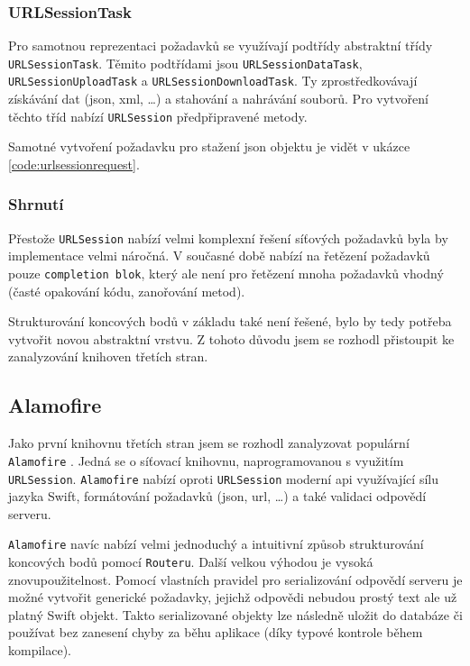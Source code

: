 
\subsubsection*{URLSessionTask}

Pro samotnou reprezentaci požadavků se využívají podtřídy abstraktní třídy \texttt{URLSessionTask}.
Těmito podtřídami jsou \texttt{URLSessionDataTask}, \texttt{URLSessionUploadTask} a \texttt{URLSessionDownloadTask}.
Ty zprostředkovávají získávání dat (\acrshort{json}, \acrshort{xml}, \ldots) a stahování a nahrávání souborů.
Pro vytvoření těchto tříd nabízí \texttt{URLSession} předpřipravené metody.

Samotné vytvoření požadavku pro stažení \acrshort{json} objektu je vidět v ukázce \ref{code:urlsessionrequest}.


\subsubsection*{Shrnutí}

Přestože \texttt{URLSession} nabízí velmi komplexní řešení síťových požadavků byla by implementace velmi náročná.
V současné době nabízí na řetězení požadavků pouze \texttt{completion blok}, který ale není pro řetězení mnoha požadavků vhodný (časté opakování kódu, zanořování metod).

Strukturování koncových bodů v základu také není řešené, bylo by tedy potřeba vytvořit novou abstraktní vrstvu.
Z tohoto důvodu jsem se rozhodl přistoupit ke zanalyzování knihoven třetích stran.

\subsection{Alamofire}

Jako první knihovnu třetích stran jsem se rozhodl zanalyzovat populární \texttt{Alamofire} \cite{github-alamofire}.
Jedná se o síťovací knihovnu, naprogramovanou s využitím \texttt{URLSession}.
\texttt{Alamofire} nabízí oproti \texttt{URLSession} moderní \acrshort{api} využívající sílu jazyka Swift, formátování požadavků (\acrshort{json}, \acrshort{url}, \ldots) a také validaci odpovědí serveru.

\texttt{Alamofire} navíc nabízí velmi jednoduchý a intuitivní způsob strukturování koncových bodů pomocí \texttt{Routeru}.
Další velkou výhodou je vysoká znovupoužitelnost.
Pomocí vlastních pravidel pro serializování odpovědí serveru je možné vytvořit generické požadavky, jejichž odpovědi nebudou prostý text ale už platný Swift objekt.
Takto serializované objekty lze následně uložit do databáze či používat bez zanesení chyby za běhu aplikace (díky typové kontrole během kompilace).

